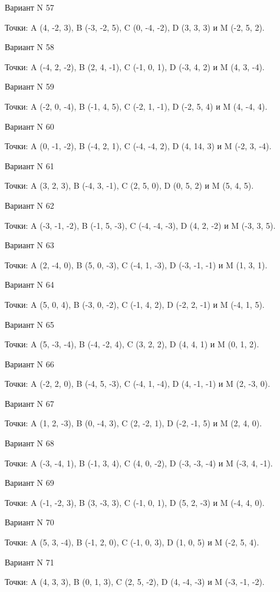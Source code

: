 \documentclass[11pt]{report}
\begin{document}
Вариант N 57

Точки: A (4, -2, 3), B (-3, -2, 5), C (0, -4, -2), D (3, 3, 3) и M (-2, 5, 2).

Вариант N 58

Точки: A (-4, 2, -2), B (2, 4, -1), C (-1, 0, 1), D (-3, 4, 2) и M (4, 3, -4).

Вариант N 59

Точки: A (-2, 0, -4), B (-1, 4, 5), C (-2, 1, -1), D (-2, 5, 4) и M (4, -4, 4).

Вариант N 60

Точки: A (0, -1, -2), B (-4, 2, 1), C (-4, -4, 2), D (4, 14, 3) и M (-2, 3, -4).

Вариант N 61

Точки: A (3, 2, 3), B (-4, 3, -1), C (2, 5, 0), D (0, 5, 2) и M (5, 4, 5).

Вариант N 62

Точки: A (-3, -1, -2), B (-1, 5, -3), C (-4, -4, -3), D (4, 2, -2) и M (-3, 3, 5).

Вариант N 63

Точки: A (2, -4, 0), B (5, 0, -3), C (-4, 1, -3), D (-3, -1, -1) и M (1, 3, 1).

Вариант N 64

Точки: A (5, 0, 4), B (-3, 0, -2), C (-1, 4, 2), D (-2, 2, -1) и M (-4, 1, 5).

Вариант N 65

Точки: A (5, -3, -4), B (-4, -2, 4), C (3, 2, 2), D (4, 4, 1) и M (0, 1, 2).

Вариант N 66

Точки: A (-2, 2, 0), B (-4, 5, -3), C (-4, 1, -4), D (4, -1, -1) и M (2, -3, 0).

Вариант N 67

Точки: A (1, 2, -3), B (0, -4, 3), C (2, -2, 1), D (-2, -1, 5) и M (2, 4, 0).

Вариант N 68

Точки: A (-3, -4, 1), B (-1, 3, 4), C (4, 0, -2), D (-3, -3, -4) и M (-3, 4, -1).

Вариант N 69

Точки: A (-1, -2, 3), B (3, -3, 3), C (-1, 0, 1), D (5, 2, -3) и M (-4, 4, 0).

Вариант N 70

Точки: A (5, 3, -4), B (-1, 2, 0), C (-1, 0, 3), D (1, 0, 5) и M (-2, 5, 4).

Вариант N 71

Точки: A (4, 3, 3), B (0, 1, 3), C (2, 5, -2), D (4, -4, -3) и M (-3, -1, -2).
\end{document}
